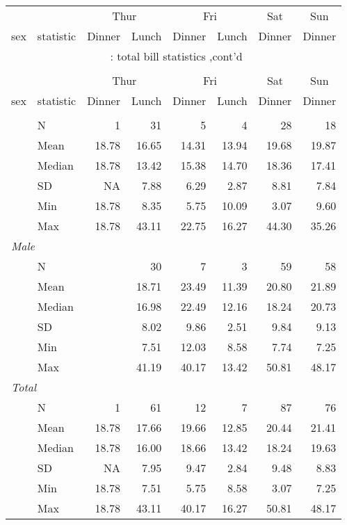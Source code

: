\documentclass[8pt]{beamer}
\begin{document}
\begin{frame}
\hypertarget{total bill statistics}{} 
\begin{longtable}{llrrrrrr}
\toprule
&&
\multicolumn{2}{c}{Thur}&\multicolumn{2}{c}{Fri}&\multicolumn{1}{c}{Sat}&\multicolumn{1}{c}{Sun} \\
\cmidrule(lr){3-4} \cmidrule(lr){5-6} \cmidrule(lr){7-7} \cmidrule(lr){8-8}
sex & statistic & Dinner & Lunch & Dinner & Lunch & Dinner & Dinner \\
\hline
\endfirsthead
\multicolumn{8}{c}{\tablename~\thetable{}: total bill statistics ,cont'd}\\\\
\toprule
&&
\multicolumn{2}{c}{Thur}&\multicolumn{2}{c}{Fri}&\multicolumn{1}{c}{Sat}&\multicolumn{1}{c}{Sun} \\
\cmidrule(lr){3-4} \cmidrule(lr){5-6} \cmidrule(lr){7-7} \cmidrule(lr){8-8}
sex & statistic & Dinner & Lunch & Dinner & Lunch & Dinner & Dinner \\
\hline
\endhead \hline \endfoot \hline

\endlastfoot
\multicolumn{ 7 }{l}{\textit{ Female }}\\
& N & 1 & 31 & 5 & 4 & 28 & 18 \\
 & Mean & 18.78 & 16.65 & 14.31 & 13.94 & 19.68 & 19.87 \\
 & Median & 18.78 & 13.42 & 15.38 & 14.70 & 18.36 & 17.41 \\
 & SD &  NA & 7.88 & 6.29 & 2.87 & 8.81 & 7.84 \\
 & Min & 18.78 & 8.35 & 5.75 & 10.09 & 3.07 & 9.60 \\
 & Max & 18.78 & 43.11 & 22.75 & 16.27 & 44.30 & 35.26 \\
\multicolumn{ 7 }{l}{\textit{ Male }}\\
& N &  & 30 & 7 & 3 & 59 & 58 \\
 & Mean &  & 18.71 & 23.49 & 11.39 & 20.80 & 21.89 \\
 & Median &  & 16.98 & 22.49 & 12.16 & 18.24 & 20.73 \\
 & SD &  & 8.02 & 9.86 & 2.51 & 9.84 & 9.13 \\
 & Min &  & 7.51 & 12.03 & 8.58 & 7.74 & 7.25 \\
 & Max &  & 41.19 & 40.17 & 13.42 & 50.81 & 48.17 \\
\multicolumn{ 7 }{l}{\textit{ Total }}\\
& N & 1 & 61 & 12 & 7 & 87 & 76 \\
 & Mean & 18.78 & 17.66 & 19.66 & 12.85 & 20.44 & 21.41 \\
 & Median & 18.78 & 16.00 & 18.66 & 13.42 & 18.24 & 19.63 \\
 & SD &  NA & 7.95 & 9.47 & 2.84 & 9.48 & 8.83 \\
 & Min & 18.78 & 7.51 & 5.75 & 8.58 & 3.07 & 7.25 \\
 & Max & 18.78 & 43.11 & 40.17 & 16.27 & 50.81 & 48.17 \\
\end{longtable}
\end{frame}
\end{document}
